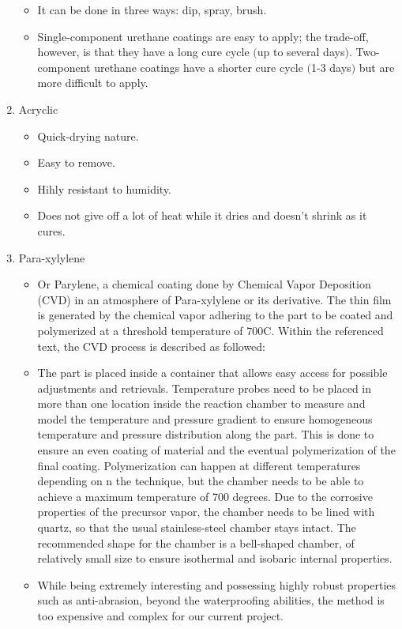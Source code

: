 \documentclass{article}[10pt]
\begin{document}
\begin{enumerate}
\begin{itemize}
              \item It can be done in three ways: dip, spray, brush.
              \item Single-component urethane coatings are easy to apply; the trade-off, however, is that they have a long cure cycle $($up to several days$)$. Two-component urethane coatings have a shorter cure cycle $($1-3 days$)$ but are more difficult to apply.
          \end{itemize}
    \item Acryclic
          \begin{itemize}
              \item Quick-drying nature.
              \item Easy to remove.
              \item Hihly resistant to humidity.
              \item Does not give off a lot of heat while it dries and doesn't shrink as it cures.
          \end{itemize}
    \item Para-xylylene
          \begin{itemize}
              \item Or Parylene, a chemical coating done by Chemical Vapor Deposition (CVD) in an atmosphere of Para-xylylene or its derivative. The thin film is generated by the chemical vapor adhering to the part to be coated and polymerized at a threshold temperature of 700C. Within the referenced text, the CVD process is described as followed:
              \item The part is placed inside a container that allows easy access for possible adjustments and retrievals. Temperature probes need to be placed in more than one location inside the reaction chamber to measure and model the temperature and pressure gradient to ensure homogeneous temperature and pressure distribution along the part. This is done to ensure an even coating of material and the eventual polymerization of the final coating. Polymerization can happen at different temperatures depending on n the technique, but the chamber needs to be able to achieve a maximum temperature of 700 degrees. Due to the corrosive properties of the precursor vapor, the chamber needs to be lined with quartz, so that the usual stainless-steel chamber stays intact. The recommended shape for the chamber is a bell-shaped chamber, of relatively small size to ensure isothermal and isobaric internal properties.
              \item While being extremely interesting and possessing highly robust properties such as anti-abrasion, beyond the waterproofing abilities, the method is too expensive and complex for our current project.


\end{itemize}
\end{enumerate}
\end{document}
